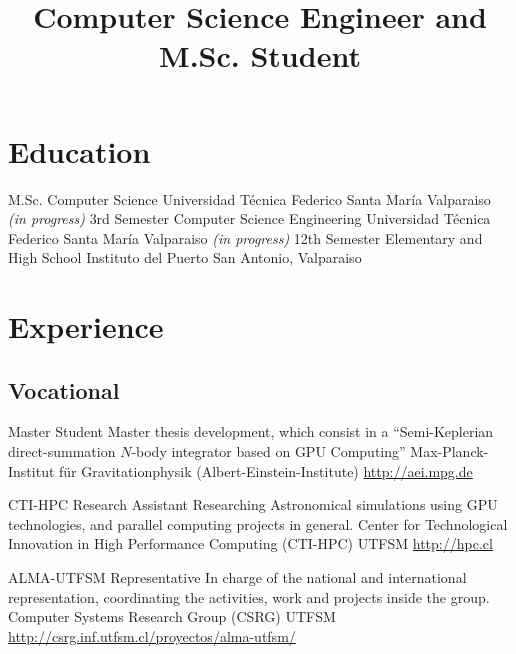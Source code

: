 \documentclass[11pt,a4paper]{moderncv}
\title{\large Computer Science Engineer and M.Sc. Student}
\begin{document}
\maketitle

%
%
\section{Education}

        {M.Sc. Computer Science}
        {Universidad Técnica Federico Santa María}
        {Valparaiso}
        {\emph{(in progress)}}
        {3rd Semester}
        {Computer Science Engineering}
        {Universidad Técnica Federico Santa María}
        {Valparaiso}
        {\emph{(in progress)}}
        {12th Semester}
        {Elementary and High School}
        {Instituto del Puerto}
        {San Antonio, Valparaiso}
        {}{}

\vspace{-0.5cm}

%
%
\section{Experience}
\subsection{Vocational}

        {Master Student}
        {Master thesis development, which consist in a %
        ``Semi-Keplerian direct-summation $N$-body integrator based on %
        GPU Computing'' }
        {Max-Planck-Institut für Gravitationphysik (Albert-Einstein-Institute)}
        {}
        {\url{http://aei.mpg.de}}


        {CTI-HPC Research Assistant}
        {Researching Astronomical simulations using GPU technologies, %
        and parallel computing projects in general.}
        {Center for Technological Innovation in High Performance Computing (CTI-HPC)}
        {UTFSM}
        {\url{http://hpc.cl}}

        {ALMA-UTFSM Representative}
        {In charge of the national and international representation, coordinating the activities, work and projects inside the group.}
        {Computer Systems Research Group (CSRG)}
        {UTFSM}
        {\url{http://csrg.inf.utfsm.cl/proyectos/alma-utfsm/}}
\end{document}
